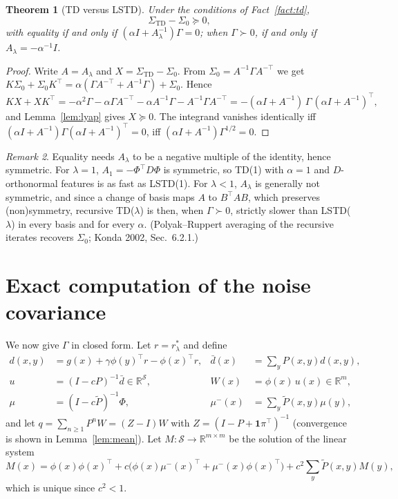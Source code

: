\documentclass[11pt]{article}
\newtheorem{theorem}{Theorem}[section]
\theoremstyle{definition}
\theoremstyle{remark}
\newtheorem{remark}[theorem]{Remark}
\newcommand{\R}{\mathbb{R}}
\newcommand{\X}{\mathcal{S}}
\newcommand{\one}{\mathbf{1}}
\begin{document}
\begin{theorem}[TD versus LSTD]\label{thm:td-lstd}
Under the conditions of Fact~\ref{fact:td},
\[
  \Sigma_{\mathrm{TD}} - \Sigma_0 \succeq 0,
\]
with equality if and only if $(\alpha I + A_\lambda^{-1})\Gamma = 0$; when $\Gamma \succ 0$,
if and only if $A_\lambda = -\alpha^{-1}I$.
\end{theorem}
\begin{proof}
Write $A = A_\lambda$ and $X = \Sigma_{\mathrm{TD}} - \Sigma_0$. From
$\Sigma_0 = A^{-1}\Gamma A^{-\top}$ we get
$K\Sigma_0 + \Sigma_0K^\top = \alpha(\Gamma A^{-\top} + A^{-1}\Gamma) + \Sigma_0$. Hence
\[
  KX + XK^\top = -\alpha^2\Gamma - \alpha\Gamma A^{-\top} - \alpha A^{-1}\Gamma - A^{-1}\Gamma A^{-\top}
  = -(\alpha I + A^{-1})\,\Gamma\,(\alpha I + A^{-1})^\top ,
\]
and Lemma~\ref{lem:lyap} gives $X \succeq 0$. The integrand vanishes identically iff
$(\alpha I + A^{-1})\Gamma(\alpha I + A^{-1})^\top = 0$, iff
$(\alpha I + A^{-1})\Gamma^{1/2} = 0$.
\end{proof}

\begin{remark}
Equality needs $A_\lambda$ to be a negative multiple of the identity, hence symmetric.
For $\lambda = 1$, $A_1 = -\Phi^\top D\Phi$ is symmetric, so TD(1) with $\alpha = 1$
and $D$-orthonormal features is as fast as LSTD(1). For $\lambda < 1$, $A_\lambda$ is
generally not symmetric, and since a change of basis maps $A$ to $B^\top AB$, which
preserves (non)symmetry, recursive TD($\lambda$) is then, when $\Gamma \succ 0$, strictly
slower than LSTD($\lambda$) in every basis and for every $\alpha$. (Polyak--Ruppert averaging of
the recursive iterates recovers $\Sigma_0$; Konda 2002, Sec.~6.2.1.)
\end{remark}

\section{Exact computation of the noise covariance}

We now give $\Gamma$ in closed form. Let $r = r^*_\lambda$ and define
\begin{align*}
  d(x,y) &= g(x) + \gamma\phi(y)^\top r - \phi(x)^\top r, &
  \bar d(x) &= \textstyle\sum_y P(x,y)d(x,y), \\
  u &= (I - cP)^{-1}\bar d \in \R^\X, &
  W(x) &= \phi(x)\,u(x) \in \R^m, \\
  \mu &= (I - c\tilde P)^{-1}\Phi, &
  \mu^-(x) &= \textstyle\sum_y\tilde P(x,y)\mu(y),
\end{align*}
and let $q = \sum_{n\ge1}P^nW = (Z - I)W$ with $Z = (I - P + \one\pi^\top)^{-1}$
(convergence is shown in Lemma~\ref{lem:mean}). Let $M : \X \to \R^{m\times m}$ be the
solution of the linear system
\[
  M(x) = \phi(x)\phi(x)^\top + c\big(\phi(x)\mu^-(x)^\top + \mu^-(x)\phi(x)^\top\big)
    + c^2\sum_y\tilde P(x,y)M(y),
\]
which is unique since $c^2 < 1$.
\end{document}
